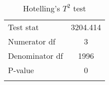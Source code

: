 \begin{table}[h]
\centering
\caption{Hotelling's $T^2$ test}\label{tab:hotelling}
\begin{tabular}{lc}
 \hline 
Test stat &3204.414\\
Numerator df & 3\\
Denominator df & 1996\\
P-value & 0\\\hline\\
\end{tabular}
\end{table}

